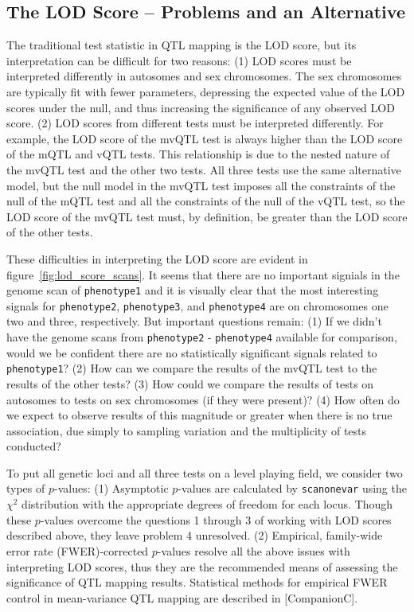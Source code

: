 \documentclass{article}
\begin{document}
\subsection*{The LOD Score -- Problems and an Alternative}
The traditional test statistic in QTL mapping is the LOD score, but its interpretation can be difficult for two reasons:
(1) LOD scores must be interpreted differently in autosomes and sex chromosomes.
The sex chromosomes are typically fit with fewer parameters, depressing the expected value of the LOD scores under the null, and thus increasing the significance of any observed LOD score.
(2) LOD scores from different tests must be interpreted differently.
For example, the LOD score of the mvQTL test is always higher than the LOD score of the mQTL and vQTL tests.
This relationship is due to the nested nature of the mvQTL test and the other two tests.
All three tests use the same alternative model, but the null model in the mvQTL test imposes all the constraints of the null of the mQTL test and all the constraints of the null of the vQTL test, so the LOD score of the mvQTL test must, by definition, be greater than the LOD score of the other tests.

These difficulties in interpreting the LOD score are evident in figure~\ref{fig:lod_score_scans}.
It seems that there are no important signials in the genome scan of \texttt{phenotype1} and it is visually clear that the most interesting signals for \texttt{phenotype2}, \texttt{phenotype3}, and \texttt{phenotype4} are on chromosomes one two and three, respectively.
But important questions remain:
(1) If we didn't have the genome scans from \texttt{phenotype2} - \texttt{phenotype4} available for comparison, would we be confident there are no statistically significant signals related to \texttt{phenotype1}?
(2) How can we compare the results of the mvQTL test to the results of the other tests?
(3) How could we compare the results of tests on autosomes to tests on sex chromosomes (if they were present)?
(4) How often do we expect to observe results of this magnitude or greater when there is no true association, due simply to sampling variation and the multiplicity of tests conducted?

To put all genetic loci and all three tests on a level playing field, we consider two types of $p$-values:
(1) Asymptotic $p$-values are calculated by \texttt{scanonevar} using the $\chi^2$ distribution with the appropriate degrees of freedom for each locus.
Though these $p$-values overcome the questions 1 through 3 of working with LOD scores described above, they leave problem 4 unresolved.
(2) Empirical, family-wide error rate (FWER)-corrected $p$-values resolve all the above issues with interpreting LOD scores, thus they are the recommended means of assessing the significance of QTL mapping results.
Statistical methods for empirical FWER control in mean-variance QTL mapping are described in [CompanionC].
\end{document}
